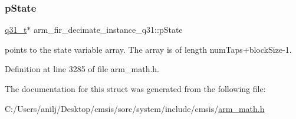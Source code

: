 \subsubsection{\texorpdfstring{p\+State}{pState}}
{\footnotesize\ttfamily \hyperlink{arm__math_8h_adc89a3547f5324b7b3b95adec3806bc0}{q31\+\_\+t}$\ast$ arm\+\_\+fir\+\_\+decimate\+\_\+instance\+\_\+q31\+::p\+State}

points to the state variable array. The array is of length num\+Taps+block\+Size-\/1. 

Definition at line 3285 of file arm\+\_\+math.\+h.



The documentation for this struct was generated from the following file\+:\begin{DoxyCompactItemize}
\item 
C\+:/\+Users/anilj/\+Desktop/cmsis/sorc/system/include/cmsis/\hyperlink{arm__math_8h}{arm\+\_\+math.\+h}\end{DoxyCompactItemize}
